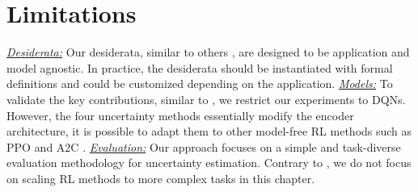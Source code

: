 \section{Limitations}
\label{sec:limitations_011}

\underline{\textit{Desiderata:}} Our desiderata, similar to others \citep{graph-postnet, desiderata-ml-lifecycle, overview-interpretable-ml}, are designed to be application and model agnostic. In practice, the desiderata should be instantiated with formal definitions and could be customized depending on the application. \underline{\textit{Models:}} To validate the key contributions, similar to \citep{distributional-rl-prespective, iqn, bootstrapped-dqn}, we restrict our experiments to DQNs. However, the four uncertainty methods essentially modify the encoder architecture, it is possible to adapt them to other model-free RL methods such as PPO \citep{ppo} and A2C \citep{a2c}. \underline{\textit{Evaluation:}} Our approach focuses on a simple and task-diverse evaluation methodology for uncertainty estimation. Contrary to \citet{procgen}, we do not focus on scaling RL methods to more complex tasks in this chapter. %

